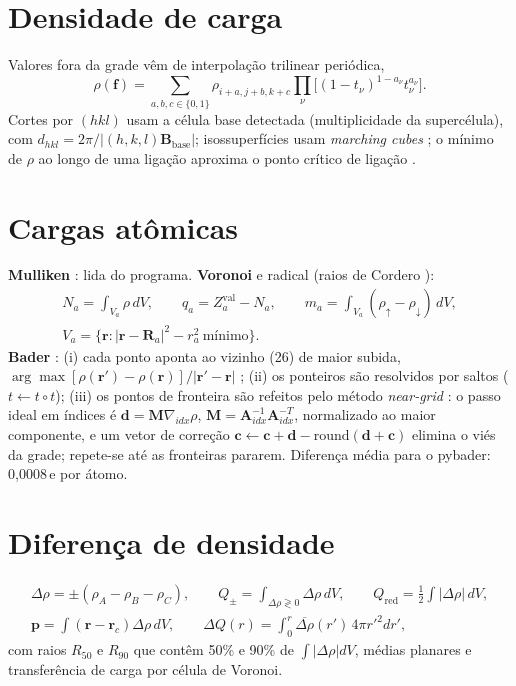 \documentclass[11pt,a4paper]{article}
\begin{document}
\section{Densidade de carga}
Valores fora da grade vêm de interpolação trilinear periódica,
\begin{equation}
\rho(\mathbf f)=\sum_{a,b,c\in\{0,1\}}\rho_{i+a,j+b,k+c}\prod_{\nu}\big[(1-t_\nu)^{1-a_\nu}t_\nu^{a_\nu}\big].
\end{equation}
Cortes por $(hkl)$ usam a célula base detectada (multiplicidade da supercélula), com $d_{hkl}=2\pi/|(h,k,l)\mathbf B_\mathrm{base}|$; isossuperfícies usam \emph{marching cubes} \cite{lorensen1987}; o mínimo de $\rho$ ao longo de uma ligação aproxima o ponto crítico de ligação \cite{bader1990}.

\section{Cargas atômicas}
\textbf{Mulliken} \cite{mulliken1955,segall1996}: lida do programa. \textbf{Voronoi} \cite{voronoi1908} e radical \cite{gellatly1982} (raios de Cordero \cite{cordero2008}):
\begin{gather}
N_a=\int_{V_a}\rho\,dV,\qquad q_a=Z_a^\mathrm{val}-N_a,\qquad m_a=\int_{V_a}(\rho_\uparrow-\rho_\downarrow)\,dV,\\ V_a=\{\mathbf r:|\mathbf r-\mathbf R_a|^2-r_a^2\ \text{mínimo}\}.
\end{gather}
\textbf{Bader} \cite{bader1990}: (i) cada ponto aponta ao vizinho (26) de maior subida, $\arg\max[\rho(\mathbf r')-\rho(\mathbf r)]/|\mathbf r'-\mathbf r|$ \cite{henkelman2006}; (ii) os ponteiros são resolvidos por saltos ($t\leftarrow t\circ t$); (iii) os pontos de fronteira são refeitos pelo método \emph{near-grid} \cite{tang2009bader}: o passo ideal em índices é $\mathbf d=\mathbf M\nabla_{\!idx}\rho$, $\mathbf M=\mathbf A_{idx}^{-1}\mathbf A_{idx}^{-T}$, normalizado ao maior componente, e um vetor de correção $\mathbf c\leftarrow\mathbf c+\mathbf d-\mathrm{round}(\mathbf d+\mathbf c)$ elimina o viés da grade; repete-se até as fronteiras pararem. Diferença média para o pybader: 0,0008\,e por átomo.

\section{Diferença de densidade}
\begin{gather}
\Delta\rho=\pm(\rho_A-\rho_B-\rho_C),\qquad Q_\pm=\int_{\Delta\rho\gtrless0}\Delta\rho\,dV,\qquad Q_\mathrm{red}=\tfrac12\int|\Delta\rho|\,dV,\\
\mathbf p=\int(\mathbf r-\mathbf r_c)\Delta\rho\,dV,\qquad \Delta Q(r)=\int_0^r\overline{\Delta\rho}(r')\,4\pi r'^2dr',
\end{gather}
com raios $R_{50}$ e $R_{90}$ que contêm 50\% e 90\% de $\int|\Delta\rho|dV$, médias planares e transferência de carga por célula de Voronoi.
\end{document}
